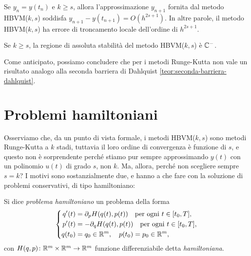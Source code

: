 \begin{teor} \label{teorema-ordine-convergenza-HBVM}
Se $y_n = y(t_n)$ e $k \geq s$, allora l'approssimazione $y_{n+1}$ fornita
dal metodo HBVM($k,s$) soddisfa $y_{n+1}-y(t_{n+1}) = O(h^{2s+1})$.
In altre parole, il metodo HBVM($k,s$) ha errore di troncamento locale
dell'ordine di $h^{2s+1}$.
\end{teor}

\begin{teor}
Se $k \geq s$, la regione di assoluta stabilità del metodo HBVM($k,s$) è $\mathbb{C}^-$.
\end{teor}

\noindent Come anticipato, possiamo concludere che per i metodi Runge-Kutta
non vale un risultato analogo alla seconda barriera di Dahlquist
\ref{teor:seconda-barriera-dahlquist}.

\section{Problemi hamiltoniani}

Osserviamo che, da un punto di vista formale, i metodi HBVM($k,s$) sono metodi
Runge-Kutta a $k$ stadi, tuttavia il loro ordine di convergenza è funzione di $s$,
e questo non è sorprendente perché stiamo pur sempre approssimando $y(t)$
con un polinomio $u(t)$ di grado $s$, non $k$.
Ma, allora, perché non scegliere sempre $s=k$?
I motivi sono sostanzialmente due, e hanno a che fare con la soluzione
di problemi conservativi, di tipo hamiltoniano:

\begin{defi}
Si dice \emph{problema hamiltoniano} un problema della forma
\begin{equation} \label{eq:problema-hamiltoniano-qp}
\left\{
\begin{aligned}
q'(t)  &= \partial_p H (q(t),p(t)) \quad \text{per ogni $t \in [t_0,T]$}, \\
p'(t)  &= - \partial_q H (q(t),p(t)) \quad \text{per ogni $t \in [t_0,T]$}, \\
q(t_0) &= q_0 \in \mathbb{R}^m, \quad p(t_0) = p_0 \in \mathbb{R}^m,
\end{aligned}
\right.
\end{equation}
con $H(q,p) \colon \mathbb{R}^m \times \mathbb{R}^m \to \mathbb{R}^m$ funzione differenziabile
detta \emph{hamiltoniana}.
\end{defi}

